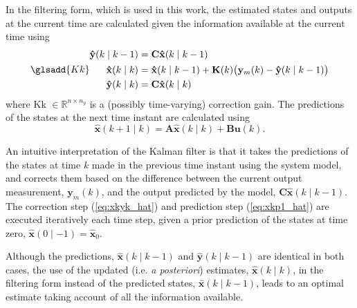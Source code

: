 In the filtering form, which is used in this work, the estimated states and outputs at the current time are calculated given the information available at the current time using
\begin{equation} \label{eq:xkyk_hat} \glsadd{Kk}
	\begin{aligned}
		\mathbf{\hat{y}}(k \mid k-1) &= \mathbf{C} \mathbf{\hat{x}}(k \mid k-1) \\
		\mathbf{\hat{x}}(k \mid k) &= \mathbf{\hat{x}}(k \mid k-1) + \mathbf{K}(k) \big( \mathbf{y}_m(k) - \mathbf{\hat{y}}(k \mid k-1)  \big) \\
		\mathbf{\hat{y}}(k \mid k) &= \mathbf{C} \mathbf{\hat{x}}(k \mid k)
	\end{aligned}
\end{equation}
where \gls{Kk} $\in \mathbb{R}^{n \times n_y}$ is a (possibly time-varying) correction gain. The predictions of the states at the next time instant are calculated using
\begin{equation} \label{eq:xkp1_hat}
	\mathbf{\hat{x}}(k+1 \mid k) = \mathbf{A} \mathbf{\hat{x}}(k \mid k) + \mathbf{B} \mathbf{u}(k).
\end{equation}

An intuitive interpretation of the Kalman filter is that it takes the predictions of the states at time $k$ made in the previous time instant using the system model, and corrects them based on the difference between the current output measurement, $\mathbf{y}_m(k)$, and the output predicted by the model, $\mathbf{C} \mathbf{\hat{x}}(k \mid k-1)$. The correction step (\ref{eq:xkyk_hat}) and prediction step (\ref{eq:xkp1_hat}) are executed iteratively each time step, given a prior prediction of the states at time zero, $\mathbf{\hat{x}}(0 \mid -1)=\mathbf{\hat{x}}_0$.

Although the predictions, $\mathbf{\hat{x}}(k \mid k-1)$ and $\mathbf{\hat{y}}(k \mid k-1)$ are identical in both cases, the use of the updated (i.e. \textit{a posteriori}) estimates, $\mathbf{\hat{x}}(k \mid k)$, in the filtering form instead of the predicted states, $\mathbf{\hat{x}}(k \mid k-1)$, leads to an optimal estimate taking account of all the information available.

